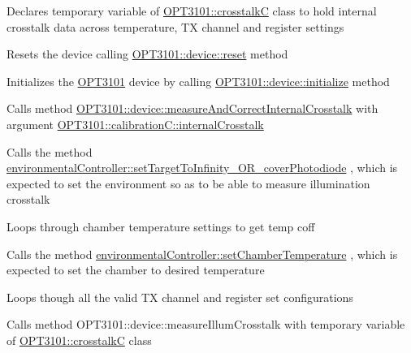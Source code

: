 \begin{DoxyItemize}
\item Declares temporary variable of \mbox{\hyperlink{class_o_p_t3101_1_1crosstalk_c}{O\+P\+T3101\+::crosstalkC}} class to hold internal crosstalk data across temperature, TX channel and register settings
\item Resets the device calling \mbox{\hyperlink{class_o_p_t3101_1_1device_a1d37b22f535d8130c7f24799f7fa3c33}{O\+P\+T3101\+::device\+::reset}} method
\item Initializes the \mbox{\hyperlink{namespace_o_p_t3101}{O\+P\+T3101}} device by calling \mbox{\hyperlink{class_o_p_t3101_1_1device_ae3b7fb4f9a8f1dee330523e034aa9460}{O\+P\+T3101\+::device\+::initialize}} method
\item Calls method \mbox{\hyperlink{class_o_p_t3101_1_1device_a44f832d6edbfb26db079ddba4debfdba}{O\+P\+T3101\+::device\+::measure\+And\+Correct\+Internal\+Crosstalk}} with argument \mbox{\hyperlink{class_o_p_t3101_1_1calibration_c_a4df5b876541e9b33eadf6290fe08b7e5}{O\+P\+T3101\+::calibration\+C\+::internal\+Crosstalk}}
\item Calls the method \mbox{\hyperlink{classenvironmental_controller_a8a1fb44efff232844f00de18e174d4ce}{environmental\+Controller\+::set\+Target\+To\+Infinity\+\_\+\+O\+R\+\_\+cover\+Photodiode}} , which is expected to set the environment so as to be able to measure illumination crosstalk
\item Loops through chamber temperature settings to get temp coff
\item Calls the method \mbox{\hyperlink{classenvironmental_controller_a3c23e944f34f2d7c0fa0b279d5fc8a3f}{environmental\+Controller\+::set\+Chamber\+Temperature}} , which is expected to set the chamber to desired temperature
\item Loops though all the valid TX channel and register set configurations
\item Calls method O\+P\+T3101\+::device\+::measure\+Illum\+Crosstalk with temporary variable of \mbox{\hyperlink{class_o_p_t3101_1_1crosstalk_c}{O\+P\+T3101\+::crosstalkC}} class ~\newline
~\newline
~\newline
~\newline
~\newline
~\newline
~\newline


\end{DoxyItemize}
